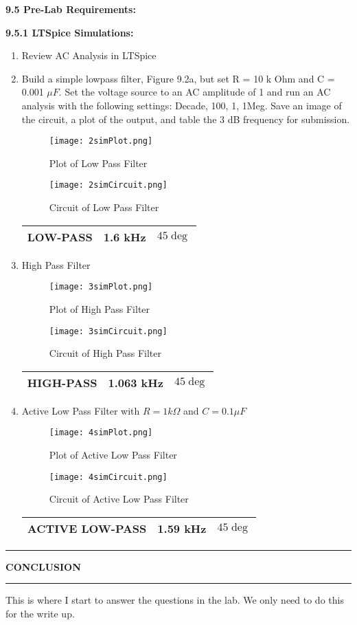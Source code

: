 \documentclass{article}
\begin{document}
\textbf{\large 9.5 Pre-Lab Requirements:}

\textbf{9.5.1 LTSpice Simulations:}
\begin{enumerate}
    \item Review AC Analysis in LTSpice
    \item Build a simple lowpass filter, Figure 9.2a, but set R = 10 k Ohm and C =
    0.001 $\mu F$. Set the voltage source to an AC amplitude of 1 and run an AC
    analysis with the following settings: Decade, 100, 1, 1Meg. Save an image of
    the circuit, a plot of the output, and table the 3 dB frequency for submission.
    \begin{figure}[H]
        \centering
        \texttt{[image: 2simPlot.png]}
        \caption{Plot of Low Pass Filter}
    \end{figure}
    \begin{figure}[H]
        \centering
        \texttt{[image: 2simCircuit.png]}
        \caption{Circuit of Low Pass Filter}
    \end{figure}
    \begin{tabular}{|c|c|c|}
        \hline
        LOW-PASS & 1.6 kHz & $45\deg$ \\
        \hline
        \end{tabular}
    \item High Pass Filter
    \begin{figure}[H]
        \centering
        \texttt{[image: 3simPlot.png]}
        \caption{Plot of High Pass Filter}
    \end{figure}
    \begin{figure}[H]
        \centering
        \texttt{[image: 3simCircuit.png]}
        \caption{Circuit of High Pass Filter}
    \end{figure}
    \begin{tabular}{|c|c|c|}
        \hline
        HIGH-PASS & 1.063 kHz & $45\deg$ \\
        \hline
        \end{tabular}
    \item Active Low Pass Filter with $R = 1k \Omega$ and $C = 0.1 \mu F$
    \begin{figure}[H]
        \centering
        \texttt{[image: 4simPlot.png]}
        \caption{Plot of Active Low Pass Filter}
    \end{figure}
    \begin{figure}[H]
        \centering
        \texttt{[image: 4simCircuit.png]}
        \caption{Circuit of Active Low Pass Filter}
    \end{figure}
    \begin{tabular}{|c|c|c|}
        \hline
        ACTIVE LOW-PASS & 1.59 kHz & $45\deg$ \\
        \hline
        \end{tabular}

\end{enumerate}

\begin{center}
    \hrule
    \vspace{0.2cm}
    \textbf{\large CONCLUSION}
    \vspace{0.2cm}
    \hrule
\end{center}

This is where I start to answer the questions in the lab. We only need to do this for the write up.
\end{document}
